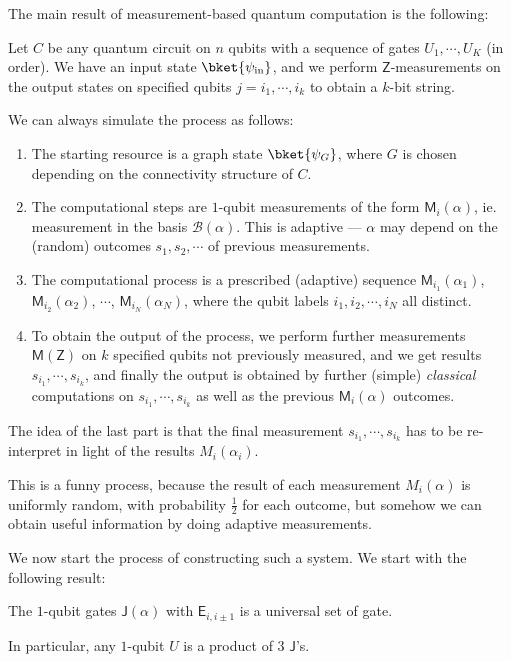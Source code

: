 \documentclass[a4paper]{article}
\newcommand{\qE}{\mathsf{E}}
\newcommand{\qJ}{\mathsf{J}}
\newcommand{\qM}{\mathsf{M}}
\newcommand{\qZ}{\mathsf{Z}}
\begin{document}
The main result of measurement-based quantum computation is the following:
\begin{thm}
  Let $C$ be any quantum circuit on $n$ qubits with a sequence of gates $U_1, \cdots, U_K$ (in order). We have an input state $\bket{\psi_{\mathrm{in}}}$, and we perform $\qZ$-measurements on the output states on specified qubits $j = i_1, \cdots, i_k$ to obtain a $k$-bit string.

  We can always simulate the process as follows:
  \begin{enumerate}
    \item The starting resource is a graph state $\bket{\psi_G}$, where $G$ is chosen depending on the connectivity structure of $C$.
    \item The computational steps are $1$-qubit measurements of the form $\qM_i(\alpha)$, ie. measurement in the basis $\mathcal{B}(\alpha)$. This is adaptive --- $\alpha$ may depend on the (random) outcomes $s_1, s_2, \cdots$ of previous measurements.
    \item The computational process is a prescribed (adaptive) sequence $\qM_{i_1}(\alpha_1)$, $\qM_{i_2}(\alpha_2)$, $\cdots$, $\qM_{i_N}(\alpha_N)$, where the qubit labels $i_1, i_2, \cdots, i_N$ all distinct.
    \item To obtain the output of the process, we perform further measurements $\qM(\qZ)$ on $k$ specified qubits not previously measured, and we get results $s_{i_1}, \cdots, s_{i_k}$, and finally the output is obtained by further (simple) \emph{classical} computations on $s_{i_1}, \cdots, s_{i_k}$ as well as the previous $\qM_i(\alpha)$ outcomes.
  \end{enumerate}
\end{thm}
The idea of the last part is that the final measurement $s_{i_1}, \cdots, s_{i_k}$ has to be re-interpret in light of the results $M_i(\alpha_i)$.

This is a funny process, because the result of each measurement $M_i(\alpha)$ is uniformly random, with probability $\frac{1}{2}$ for each outcome, but somehow we can obtain useful information by doing adaptive measurements.

We now start the process of constructing such a system. We start with the following result:
\begin{fact}
  The $1$-qubit gates $\qJ(\alpha)$ with $\qE_{i, i\pm 1}$ is a universal set of gate.

  In particular, any $1$-qubit $U$ is a product of $3$ $\qJ$'s.
\end{fact}
\end{document}
